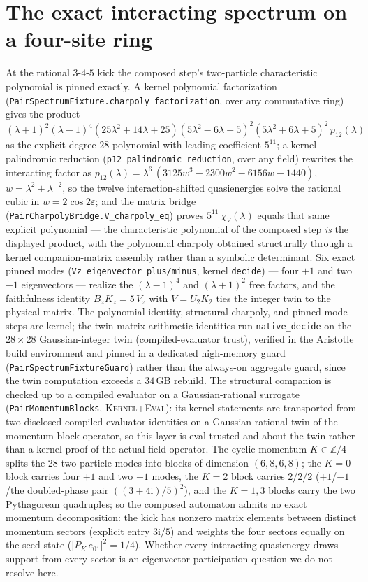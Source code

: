 \documentclass[11pt]{article}
\newcommand{\ii}{\mathrm{i}}
\newcommand{\DraftTrust}{\textcolor{draftcolor}{\textsc{Kernel+Eval}}}
\begin{document}
\section{The exact interacting spectrum on a four-site ring}
At the rational $3$-$4$-$5$ kick the composed step's two-particle
characteristic polynomial is pinned exactly.  A kernel polynomial
factorization (\texttt{PairSpectrumFixture.charpoly\_factorization},
over any commutative ring) gives the product
$(\lambda+1)^2(\lambda-1)^4(25\lambda^2+14\lambda+25)
(5\lambda^2-6\lambda+5)^2(5\lambda^2+6\lambda+5)^2\,p_{12}(\lambda)$
as the explicit degree-$28$ polynomial with leading coefficient $5^{11}$;
a kernel palindromic reduction (\texttt{p12\_palindromic\_reduction},
over any field) rewrites the interacting factor as
$p_{12}(\lambda)=\lambda^6\,(3125w^3-2300w^2-6156w-1440)$,
$w=\lambda^2+\lambda^{-2}$, so the twelve interaction-shifted
quasienergies solve the rational cubic in $w=2\cos2\varepsilon$; and the
matrix bridge (\texttt{PairCharpolyBridge.V\_charpoly\_eq}) proves
$5^{11}\,\chi_V(\lambda)$ equals that same explicit polynomial --- the
characteristic polynomial of the composed step \emph{is} the displayed
product, with the polynomial charpoly obtained structurally through a
kernel companion-matrix assembly rather than a symbolic determinant.
Six exact pinned modes (\texttt{Vz\_eigenvector\_plus/minus}, kernel
\texttt{decide}) --- four $+1$ and two $-1$ eigenvectors --- realize the
$(\lambda-1)^4$ and $(\lambda+1)^2$ free factors, and the faithfulness
identity $B_zK_z=5\,V_z$ with $V=U_2K_2$ ties the integer twin to the
physical matrix.  The polynomial-identity, structural-charpoly, and
pinned-mode steps are kernel; the twin-matrix arithmetic identities run
\texttt{native\_decide} on the $28\times28$ Gaussian-integer twin
(compiled-evaluator trust), verified in the Aristotle build environment
and pinned in a dedicated high-memory guard
(\texttt{PairSpectrumFixtureGuard}) rather than the always-on aggregate
guard, since the twin computation exceeds a $34$\,GB rebuild.  The
structural companion is checked up to a compiled evaluator on a
Gaussian-rational surrogate
(\texttt{PairMomentumBlocks}, \DraftTrust{}): its kernel statements are
transported from two disclosed compiled-evaluator identities on a
Gaussian-rational twin of the momentum-block operator, so this layer is
eval-trusted and about the twin rather than a kernel proof of the
actual-field operator.  The cyclic momentum $K\in\mathbb{Z}/4$ splits
the 28
two-particle modes into blocks of dimension $(6,8,6,8)$; the $K=0$ block
carries four $+1$ and two $-1$ modes, the $K=2$ block carries $2/2/2$
($+1$/$-1$/the doubled-phase pair $((3+4\ii)/5)^2$), and the $K=1,3$
blocks carry the two Pythagorean quadruples; so the composed automaton
admits no exact momentum decomposition: the kick has nonzero matrix
elements between distinct momentum sectors (explicit entry $3\ii/5$) and
weights the four sectors equally on the seed state
($|P_K\,e_{01}|^2=1/4$).  Whether every interacting quasienergy draws
support from every sector is an eigenvector-participation question we do
not resolve here.
\end{document}
